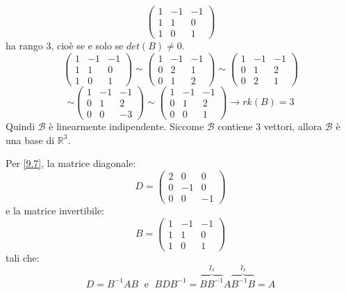 \documentclass[a4paper]{article}
\theoremstyle{break}
\theoremstyle{break}
\theoremstyle{break}
\theoremstyle{break}
\begin{document}
\begin{example}
\[\begin{pmatrix}
      1 & -1 & -1\\
      1 & 1 & 0\\
      1 & 0 & 1
    \end{pmatrix} 
    \] 
    ha rango 3, cioè se e solo se \( det(B) \neq 0 \).
    \[
    \begin{pmatrix} 
      1 & -1 & -1\\
      1 & 1 & 0\\
      1 & 0 & 1
    \end{pmatrix} 
    \sim
    \begin{pmatrix} 
      1 & -1 & -1\\
      0 & 2 & 1\\
      0 & 1 & 2
    \end{pmatrix}
    \sim
    \begin{pmatrix} 
      1 & -1 & -1\\
      0 & 1 & 2\\
      0 & 2 & 1
    \end{pmatrix} 
    \] 
    \[
    \sim
    \begin{pmatrix} 
      1 & -1 & -1\\
      0 & 1 & 2\\
      0 & 0 & -3
    \end{pmatrix} 
    \sim
    \begin{pmatrix} 
      1 & -1 & -1\\
      0 & 1 & 2\\
      0 & 0 & 1
    \end{pmatrix} \to rk(B) = 3
    \] 
    Quindi \( \mathcal{B} \) è linearmente indipendente. Siccome \( \mathcal{B} \) contiene
    3 vettori, allora \( \mathcal{B} \) è una base
    di \( \mathbb{R}^3 \).

    \vspace{1em}
    \noindent Per \ref{9.7}, la matrice diagonale:
    \[
    D = \begin{pmatrix} 
      2 & 0 & 0\\
      0 & -1 & 0\\
      0 & 0 & -1
    \end{pmatrix} 
    \] 
    e la matrice invertibile:
    \[
    B = \begin{pmatrix} 
      1 & -1 & -1\\
      1 & 1 & 0\\
      1 & 0 & 1
    \end{pmatrix} 
    \] 
    tali che: 
    \[
    D = B^{-1}AB \;\text{ e }\; BDB^{-1} = \overbrace{BB^{-1}}^{I_3}A\overbrace{B^{-1}B}^{I_3} = A 
  \]
\end{example}
\end{document}
